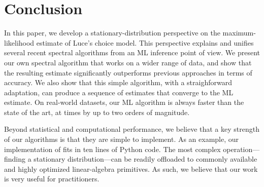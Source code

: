 \section{Conclusion}
\label{sec:conclusion}

In this paper, we develop a stationary-distribution perspective on the maximum-likelihood estimate of Luce's choice model.
This perspective explains and unifies several recent spectral algorithms from an ML inference point of view.
We present our own spectral algorithm that works on a wider range of data, and show that the resulting estimate significantly outperforms previous approaches in terms of accuracy.
We also show that this simple algorithm, with a straighforward adaptation, can produce a sequence of estimates that converge to the ML estimate.
On real-world datasets, our ML algorithm is always faster than the state of the art, at times by up to two orders of magnitude.

Beyond statistical and computational performance, we believe that a key strength of our algorithms is that they are simple to implement.
As an example, our implementation of \LSR{} fits in ten lines of Python code.
The most complex operation---finding a stationary distribution---can be readily offloaded to commonly available and highly optimized linear-algebra primitives.
As such, we believe that our work is very useful for practitioners.
